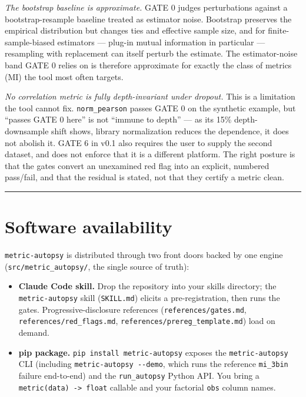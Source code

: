 \documentclass[
  11pt,
]{article}
\providecommand{\tightlist}{%
  \setlength{\itemsep}{0pt}\setlength{\parskip}{0pt}}
\begin{document}
\emph{The bootstrap baseline is approximate.} GATE 0 judges
perturbations against a bootstrap-resample baseline treated as estimator
noise. Bootstrap preserves the empirical distribution but changes ties
and effective sample size, and for finite-sample-biased estimators ---
plug-in mutual information in particular --- resampling with replacement
can itself perturb the estimate. The estimator-noise band GATE 0 relies
on is therefore approximate for exactly the class of metrics (MI) the
tool most often targets.

\emph{No correlation metric is fully depth-invariant under dropout.}
This is a limitation the tool cannot fix. \texttt{norm\_pearson} passes
GATE 0 on the synthetic example, but ``passes GATE 0 here'' is not
``immune to depth'' --- as its 15\% depth-downsample shift shows,
library normalization reduces the dependence, it does not abolish it.
GATE 6 in v0.1 also requires the user to supply the second dataset, and
does not enforce that it is a different platform. The right posture is
that the gates convert an unexamined red flag into an explicit, numbered
pass/fail, and that the residual is stated, not that they certify a
metric clean.

\begin{center}\rule{0.5\linewidth}{0.5pt}\end{center}

\section{Software availability}\label{software-availability}

\texttt{metric-autopsy} is distributed through two front doors backed by
one engine (\texttt{src/metric\_autopsy/}, the single source of truth):

\begin{itemize}
\tightlist
\item
  \textbf{Claude Code skill.} Drop the repository into your skills
  directory; the \texttt{metric-autopsy} skill (\texttt{SKILL.md})
  elicits a pre-registration, then runs the gates.
  Progressive-disclosure references (\texttt{references/gates.md},
  \texttt{references/red\_flags.md},
  \texttt{references/prereg\_template.md}) load on demand.
\item
  \textbf{pip package.} \texttt{pip\ install\ metric-autopsy} exposes
  the \texttt{metric-autopsy} CLI (including
  \texttt{metric-autopsy\ -\/-demo}, which runs the reference
  \texttt{mi\_3bin} failure end-to-end) and the \texttt{run\_autopsy}
  Python API. You bring a \texttt{metric(data)\ -\textgreater{}\ float}
  callable and your factorial \texttt{obs} column names.
\end{itemize}
\end{document}
